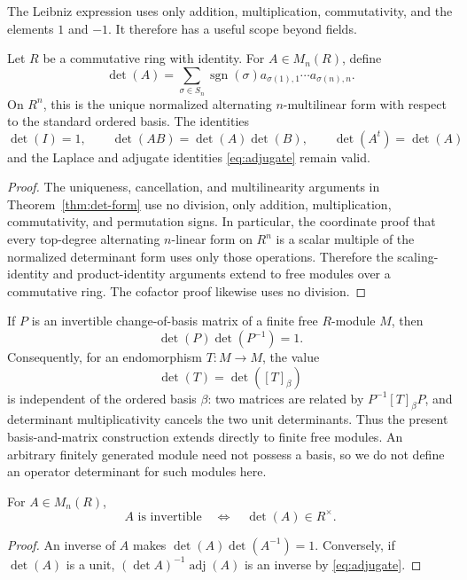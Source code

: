 The Leibniz expression uses only addition, multiplication, commutativity,
and the elements \(1\) and \(-1\). It therefore has a useful scope beyond
fields.

\begin{theorem}\label{thm:ring-determinants}
Let \(R\) be a commutative ring with identity. For \(A\in M_n(R)\), define
\[
\det(A)=
\sum_{\sigma\in S_n}\operatorname{sgn}(\sigma)
a_{\sigma(1),1}\cdots a_{\sigma(n),n}.
\]
On \(R^n\), this is the unique normalized alternating \(n\)-multilinear
form with respect to the standard ordered basis. The identities
\[
\det(I)=1,\qquad
\det(AB)=\det(A)\det(B),\qquad
\det(A^t)=\det(A)
\]
and the Laplace and adjugate identities \eqref{eq:adjugate} remain valid.
\end{theorem}
\begin{proof}
The uniqueness, cancellation, and multilinearity arguments in
Theorem~\ref{thm:det-form} use no division, only addition, multiplication,
commutativity, and permutation signs.  In particular, the coordinate proof
that every top-degree alternating \(n\)-linear form on \(R^n\) is a scalar
multiple of the normalized determinant form uses only those operations.
Therefore the scaling-identity and product-identity arguments extend to free
modules over a commutative ring.  The cofactor proof likewise uses no
division.
\end{proof}

If \(P\) is an invertible change-of-basis matrix of a finite free
\(R\)-module \(M\), then
\[
\det(P)\det(P^{-1})=1.
\]
Consequently, for an endomorphism \(T:M\to M\), the value
\[
\det(T)=\det([T]_\beta)
\]
is independent of the ordered basis \(\beta\): two matrices are related by
\(P^{-1}[T]_\beta P\), and determinant multiplicativity cancels the
two unit determinants.  Thus the present basis-and-matrix construction
extends directly to finite free modules.  An arbitrary finitely generated
module need not possess a basis, so we do not define an operator determinant
for such modules here.

\begin{corollary}
For \(A\in M_n(R)\),
\[
A\text{ is invertible}\quad\Longleftrightarrow\quad\det(A)\in R^\times.
\]
\end{corollary}
\begin{proof}
An inverse of \(A\) makes \(\det(A)\det(A^{-1})=1\). Conversely, if
\(\det(A)\) is a unit, \((\det A)^{-1}\operatorname{adj}(A)\) is an inverse
by \eqref{eq:adjugate}.
\end{proof}


